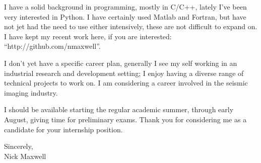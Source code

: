 \documentclass[11pt]{article}
\begin{document}
I have a solid background in programming, mostly in C/C++, lately I've been very interested in Python. I have certainly used Matlab and Fortran, but have not jet had the need to use either intensively, these are not difficult to expand on. I have kept my recent work here, if you are interested: ``http://github.com/nmaxwell''.

I don't yet have a specific career plan, generally I see my self working in an industrial research and development setting; I enjoy having a diverse range of technical projects to work on. I am considering a career involved in the seismic imaging industry. 

 I should be available starting the regular academic summer, through early August, giving time for preliminary exams. Thank you for considering me as a candidate for your internship position.


\begin{flushleft}
Sincerely, \\
Nick Maxwell
\end{flushleft}
\end{document}
